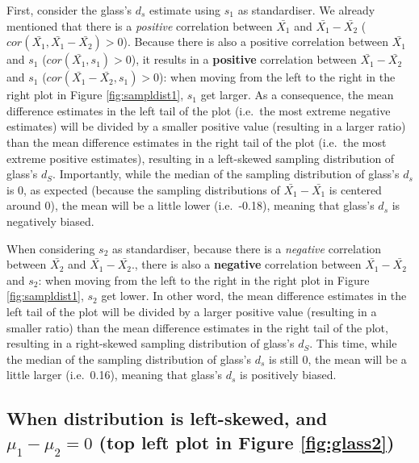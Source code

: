\documentclass[
  man,floatsintext]{apa6}
\begin{document}
First, consider the glass's \(d_s\) estimate using \(s_1\) as standardiser. We already mentioned that there is a \emph{positive} correlation between \(\bar{X_1}\) and \(\bar{X_1}-\bar{X_2}\) (\(cor(\bar{X_1},\bar{X_1}-\bar{X_2})>0\)). Because there is also a positive correlation between \(\bar{X_1}\) and \(s_1\) (\(cor(\bar{X_1},s_1)>0\)), it results in a \textbf{positive} correlation between \(\bar{X_1}-\bar{X_2}\) and \(s_1\) (\(cor(\bar{X_1}-\bar{X_2},s_1)>0\)): when moving from the left to the right in the right plot in Figure \ref{fig:sampldist1}, \(s_1\) get larger. As a consequence, the mean difference estimates in the left tail of the plot (i.e.~the most extreme negative estimates) will be divided by a smaller positive value (resulting in a larger ratio) than the mean difference estimates in the right tail of the plot (i.e.~the most extreme positive estimates), resulting in a left-skewed sampling distribution of glass's \(d_S\). Importantly, while the median of the sampling distribution of glass's \(d_s\) is 0, as expected (because the sampling distributions of \(\bar{X_1}-\bar{X_1}\) is centered around 0), the mean will be a little lower (i.e.~-0.18), meaning that glass's \(d_s\) is negatively biased.

When considering \(s_2\) as standardiser, because there is a \emph{negative} correlation between \(\bar{X_2}\) and \(\bar{X_1}-\bar{X_2}\)., there is also a \textbf{negative} correlation between \(\bar{X_1}-\bar{X_2}\) and \(s_2\): when moving from the left to the right in the right plot in Figure \ref{fig:sampldist1}, \(s_2\) get lower. In other word, the mean difference estimates in the left tail of the plot will be divided by a larger positive value (resulting in a smaller ratio) than the mean difference estimates in the right tail of the plot, resulting in a right-skewed sampling distribution of glass's \(d_S\). This time, while the median of the sampling distribution of glass's \(d_s\) is still 0, the mean will be a little larger (i.e.~0.16), meaning that glass's \(d_s\) is positively biased.

\hypertarget{when-distribution-is-left-skewed-and-mu_1-mu_20-top-left-plot-in-figure}{%
\subsection{\texorpdfstring{When distribution is left-skewed, and \textbf{\(\mu_1-\mu_2=0\)} (top left plot in Figure \ref{fig:glass2})}{When distribution is left-skewed, and \textbackslash mu\_1-\textbackslash mu\_2=0 (top left plot in Figure )}}\label{when-distribution-is-left-skewed-and-mu_1-mu_20-top-left-plot-in-figure}}
\end{document}
